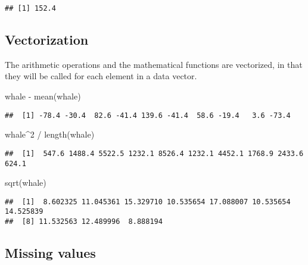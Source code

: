 \documentclass[
]{book}
\newenvironment{Shaded}{\begin{snugshade}}{\end{snugshade}}
\newcommand{\DecValTok}[1]{\textcolor[rgb]{0.00,0.00,0.81}{#1}}
\newcommand{\FunctionTok}[1]{\textcolor[rgb]{0.00,0.00,0.00}{#1}}
\newcommand{\NormalTok}[1]{#1}
\newcommand{\SpecialCharTok}[1]{\textcolor[rgb]{0.00,0.00,0.00}{#1}}
\theoremstyle{definition}
\theoremstyle{definition}
\theoremstyle{definition}
\theoremstyle{definition}
\theoremstyle{remark}
\begin{document}
\begin{verbatim}
## [1] 152.4
\end{verbatim}

\hypertarget{vectorization}{%
\subsection{Vectorization}\label{vectorization}}

The arithmetic operations and the mathematical functions are vectorized, in that they will be called for each element in a data vector.

\begin{Shaded}
\begin{Highlighting}[]
\NormalTok{whale }\SpecialCharTok{{-}} \FunctionTok{mean}\NormalTok{(whale)}
\end{Highlighting}
\end{Shaded}

\begin{verbatim}
##  [1] -78.4 -30.4  82.6 -41.4 139.6 -41.4  58.6 -19.4   3.6 -73.4
\end{verbatim}

\begin{Shaded}
\begin{Highlighting}[]
\NormalTok{whale}\SpecialCharTok{\^{}}\DecValTok{2} \SpecialCharTok{/} \FunctionTok{length}\NormalTok{(whale)}
\end{Highlighting}
\end{Shaded}

\begin{verbatim}
##  [1]  547.6 1488.4 5522.5 1232.1 8526.4 1232.1 4452.1 1768.9 2433.6  624.1
\end{verbatim}

\begin{Shaded}
\begin{Highlighting}[]
\FunctionTok{sqrt}\NormalTok{(whale)}
\end{Highlighting}
\end{Shaded}

\begin{verbatim}
##  [1]  8.602325 11.045361 15.329710 10.535654 17.088007 10.535654 14.525839
##  [8] 11.532563 12.489996  8.888194
\end{verbatim}

\hypertarget{missing-values}{%
\subsection{Missing values}\label{missing-values}}
\end{document}
